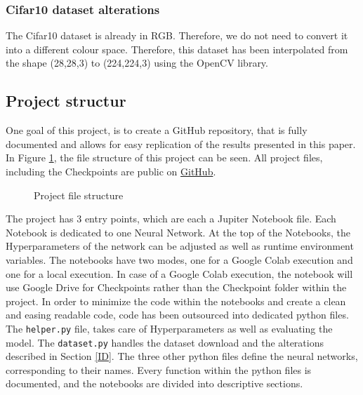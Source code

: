 \documentclass[conference]{IEEEtran}
\begin{document}
\subsubsection{Cifar10 dataset alterations}
The Cifar10 dataset is already in RGB. Therefore, we do not need to convert it into a different colour space. 
Therefore, this dataset has been interpolated from the shape (28,28,3) to (224,224,3) using the OpenCV library.

\subsection{Project structur}
One goal of this project, is to create a GitHub repository, that is fully documented and allows for easy replication of the  results presented in this paper. 
In Figure \ref{dir: file strucutre}, the file structure of this project can be seen.
All project files, including the Checkpoints are public on \href{https://github.com/devasworski/Deeper-Networks-for-Image-Classification}{GitHub}.
\begin{figure}[!htbp]
\caption{Project file structure}
\label{dir: file strucutre}
\end{figure}

The project has 3 entry points, which are each a Jupiter Notebook file. Each Notebook is dedicated to one Neural Network.
At the top of the Notebooks, the Hyperparameters of the network can be adjusted as well as runtime environment variables.
The notebooks have two modes, one for a Google Colab execution and one for a local execution.
In case of a Google Colab execution, the notebook will use Google Drive for Checkpoints rather than the Checkpoint folder within the project.
In order to minimize the code within the notebooks and create a clean and easing readable code, code has been outsourced into dedicated python files.
The \verb|helper.py| file, takes care of Hyperparameters as well as evaluating the model. The \verb|dataset.py| handles the dataset download and the alterations described in Section \ref{ID}.
The three other python files define the neural networks, corresponding to their names. Every function within the python files is documented, and the notebooks are divided into descriptive sections.
\end{document}
